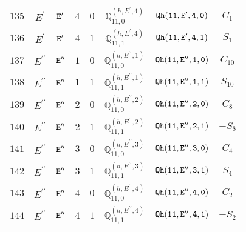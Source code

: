 \documentclass[fleqn,8pt]{jsarticle}
\begin{document}
\begin{table}[ht!]
\begin{center}
\begin{tabular}{cccccccc}
$ 135 $ & $ E^{\prime} $ & $ {\tt E'} $ & $ 4 $ & $ 0 $ & $ \mathbb{Q}_{11,0}^{(h,E^{\prime},4)} $ & $ {\tt Qh(11,E',4,0)} $ & $ C_{1} $ \\
$ 136 $ & $ E^{\prime} $ & $ {\tt E'} $ & $ 4 $ & $ 1 $ & $ \mathbb{Q}_{11,1}^{(h,E^{\prime},4)} $ & $ {\tt Qh(11,E',4,1)} $ & $ S_{1} $ \\
$ 137 $ & $ E^{\prime\prime} $ & $ {\tt E''} $ & $ 1 $ & $ 0 $ & $ \mathbb{Q}_{11,0}^{(h,E^{\prime\prime},1)} $ & $ {\tt Qh(11,E'',1,0)} $ & $ C_{10} $ \\
$ 138 $ & $ E^{\prime\prime} $ & $ {\tt E''} $ & $ 1 $ & $ 1 $ & $ \mathbb{Q}_{11,1}^{(h,E^{\prime\prime},1)} $ & $ {\tt Qh(11,E'',1,1)} $ & $ S_{10} $ \\
$ 139 $ & $ E^{\prime\prime} $ & $ {\tt E''} $ & $ 2 $ & $ 0 $ & $ \mathbb{Q}_{11,0}^{(h,E^{\prime\prime},2)} $ & $ {\tt Qh(11,E'',2,0)} $ & $ C_{8} $ \\
$ 140 $ & $ E^{\prime\prime} $ & $ {\tt E''} $ & $ 2 $ & $ 1 $ & $ \mathbb{Q}_{11,1}^{(h,E^{\prime\prime},2)} $ & $ {\tt Qh(11,E'',2,1)} $ & $ - S_{8} $ \\
$ 141 $ & $ E^{\prime\prime} $ & $ {\tt E''} $ & $ 3 $ & $ 0 $ & $ \mathbb{Q}_{11,0}^{(h,E^{\prime\prime},3)} $ & $ {\tt Qh(11,E'',3,0)} $ & $ C_{4} $ \\
$ 142 $ & $ E^{\prime\prime} $ & $ {\tt E''} $ & $ 3 $ & $ 1 $ & $ \mathbb{Q}_{11,1}^{(h,E^{\prime\prime},3)} $ & $ {\tt Qh(11,E'',3,1)} $ & $ S_{4} $ \\
$ 143 $ & $ E^{\prime\prime} $ & $ {\tt E''} $ & $ 4 $ & $ 0 $ & $ \mathbb{Q}_{11,0}^{(h,E^{\prime\prime},4)} $ & $ {\tt Qh(11,E'',4,0)} $ & $ C_{2} $ \\
$ 144 $ & $ E^{\prime\prime} $ & $ {\tt E''} $ & $ 4 $ & $ 1 $ & $ \mathbb{Q}_{11,1}^{(h,E^{\prime\prime},4)} $ & $ {\tt Qh(11,E'',4,1)} $ & $ - S_{2} $ \\
 \hline \hline
\end{tabular}
\end{center}
\end{table}
\end{document}

